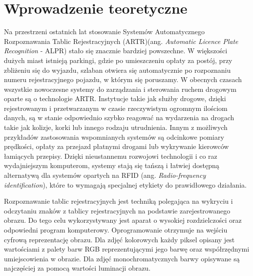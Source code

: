 %


\chapter{Wprowadzenie teoretyczne}

Na przestrzeni ostatnich lat stosowanie Systemów Automatycznego Rozpoznawania Tablic Rejestracyjnych (ARTR)(ang. \textit{Automatic Licence Plate Recognition} - ALPR) stało się znacznie bardziej powszechne.
W większości dużych miast istnieją parkingi, gdzie po umieszczeniu opłaty za postój, przy zbliżeniu się do wyjazdu, szlaban otwiera się automatycznie po rozpoznaniu numeru rejestracyjnego pojazdu, w którym się poruszamy.
W obecnych czasach wszystkie nowoczesne systemy do zarządzania i sterowania ruchem drogowym oparte są o technologie ARTR.
Instytucje takie jak służby drogowe, dzięki rejestrowanym i przetwarzanym w czasie rzeczywistym ogromnym ilościom danych, są w stanie odpowiednio szybko reagować na wydarzenia na drogach takie jak kolizje, korki lub innego rodzaju utrudnienia.
Innym z możliwych przykładów zastosowania wspomnianych systemów są odcinkowe pomiary prędkości, opłaty za przejazd płatnymi drogami lub wykrywanie kierowców łamiących przepisy.
Dzięki nieustannemu rozwojowi technologii i co raz wydajniejszym komputerom, systemy stają się tańszą i łatwiej dostępną alternatywą dla systemów opartych na RFID (ang. \textit{Radio-frequency identification}), które to wymagają specjalnej etykiety do prawidłowego działania.

Rozpoznawanie tablic rejestracyjnych jest techniką polegająca na wykryciu i odczytaniu znaków z tablicy rejestracyjnych na podstawie zarejestrowanego obrazu.
Do tego celu wykorzystywany jest aparat o wysokiej rozdzielczości oraz odpowiedni program komputerowy.
Oprogramowanie otrzymuje na wejściu cyfrową reprezentację obrazu.
Dla zdjęć kolorowych każdy piksel opisany jest wartościami z palety barw RGB reprezentującymi jego barwę oraz współrzędnymi umiejscowienia w obrazie.
Dla zdjęć monochromatycznych barwy opisywane są najczęściej za pomocą wartości luminacji obrazu.

